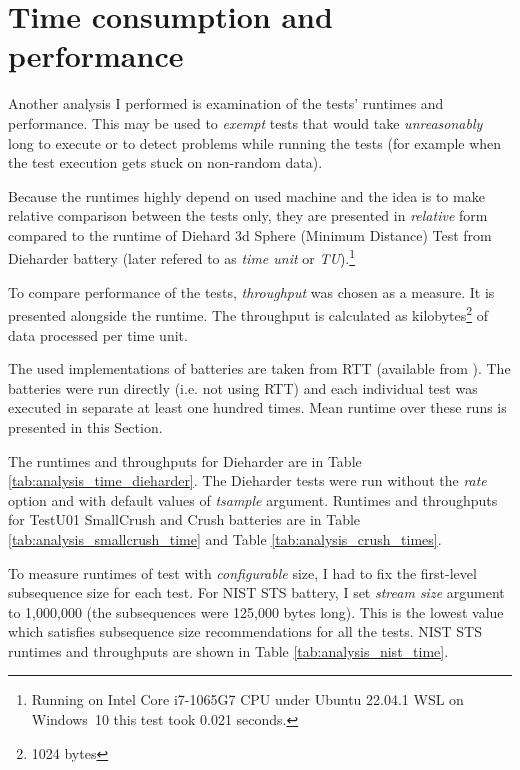 \documentclass[
  digital,     %
  oneside,     %
  nosansbold,  %
  nocolorbold, %
  nolof,         %
  nolot,         %
]{fithesis4}
\begin{document}



\section{Time consumption and performance} \label{chap:analysis-times}


Another analysis I performed is examination of the tests' runtimes and performance. This may be used to \emph{exempt} tests that would take \emph{unreasonably} long to execute or to detect problems while running the tests (for example when the test execution gets stuck on non-random data).

Because the runtimes highly depend on used machine and the idea is to make relative comparison between the tests only, they are presented in \emph{relative} form compared to the runtime of Diehard 3d Sphere (Minimum Distance) Test from Dieharder battery (later refered to as \emph{time unit} or \emph{TU}).\footnote{Running on Intel Core i7-1065G7 CPU under Ubuntu 22.04.1 WSL on Windows~10 this test took 0.021 seconds.} 

To compare performance of the tests, \emph{throughput} was chosen as a measure. It is presented alongside the runtime. The throughput is calculated as kilobytes\footnote{1024 bytes} of data processed per time unit. 

The used implementations of batteries are taken from RTT (available from \cite{rtt-batteries}). The batteries were run directly (i.e. not using RTT) and each individual test was executed in separate at least one hundred times. Mean runtime over these runs is presented in this Section.

The runtimes and throughputs for Dieharder are in Table \ref{tab:analysis_time_dieharder}. The Dieharder tests were run without the \emph{rate} option and with default values of \emph{tsample} argument. Runtimes and throughputs for TestU01 SmallCrush and Crush batteries are in Table \ref{tab:analysis_smallcrush_time} and Table \ref{tab:analysis_crush_times}.

To measure runtimes of test with \emph{configurable} size, I had to fix the first-level subsequence size for each test. For NIST STS battery, I set \emph{stream size} argument to 1,000,000 (the subsequences were 125,000  bytes long). This is the lowest value which satisfies subsequence size recommendations for all the tests. \cite{nist_special} NIST STS runtimes and throughputs are shown in Table \ref{tab:analysis_nist_time}.
\end{document}

